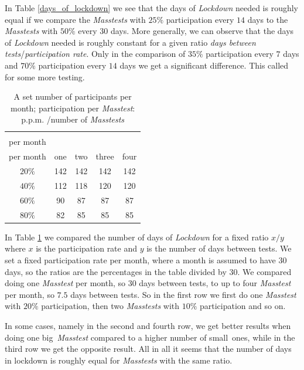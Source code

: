 \documentclass
[
    report,
    11pt,
    bibliography = totoc,
    listof = totoc,
    headinclude = true,
]
{scrreport}
\begin{document}
In Table \ref{days_of_lockdown} we see that the days of \textit{Lockdown} needed is roughly equal if we compare the \textit{Masstests} with $25\%$ participation every $14$ days to the \textit{Masstests} with $50\%$ every $30$ days. More generally, we can observe that the days of \textit{Lockdown} needed is roughly constant for a given ratio \textit{days between tests}/\textit{participation rate}. Only in the comparison of $35\%$ participation every $7$ days and $70\%$ participation every $14$ days we get a significant difference. This called for some more testing.

\begin{table}[H]
\begin{center}
\begin{tabular}{|c||c|c|c|c|}
\hline
 \diagbox{participation\\ per month}{\textit{Masstests} \\per month}& one & two & three & four \\
 \hline
 \hline
 $20\%$ &142 & 142& 142& 142 \\
 \hline
 $40\%$ & 112 & 118 & 120 & 120 \\
 \hline
 $60\%$ & 90& 87& 87 & 87\\
 \hline
 $80\%$&  82 & 85& 85& 85\\
 \hline
\end{tabular}

\end{center}
  \caption{A set number of participants per month; participation per \textit{Masstest}: p.p.m. /number of \textit{Masstests}}
  \label{intervall_vs_teilnehmer}
\end{table}

In Table \ref{intervall_vs_teilnehmer} we compared the number of days of \textit{Lockdown} for a fixed ratio $x/y$ where $x$ is the participation rate and $y$ is the number of days between tests. We set a fixed participation rate per month, where a month is assumed to have 30 days, so the ratios are the percentages in the table divided by $30$. We compared doing one \textit{Masstest} per month, so $30$ days between tests, to up to four \textit{Masstest} per month, so $7.5$ days between tests. So in the first row we first do one \textit{Masstest} with $20\%$ participation, then two \textit{Masstests} with $10\%$ participation and so on.

In some cases, namely in the second and fourth row, we get better results when doing one \glqq big\grqq~\textit{Masstest} compared to a higher number of \glqq small\grqq~ones, while in the third row we get the opposite result. All in all it seems that the number of days in lockdown is roughly equal for \textit{Masstests} with the same ratio. \\
\end{document}
